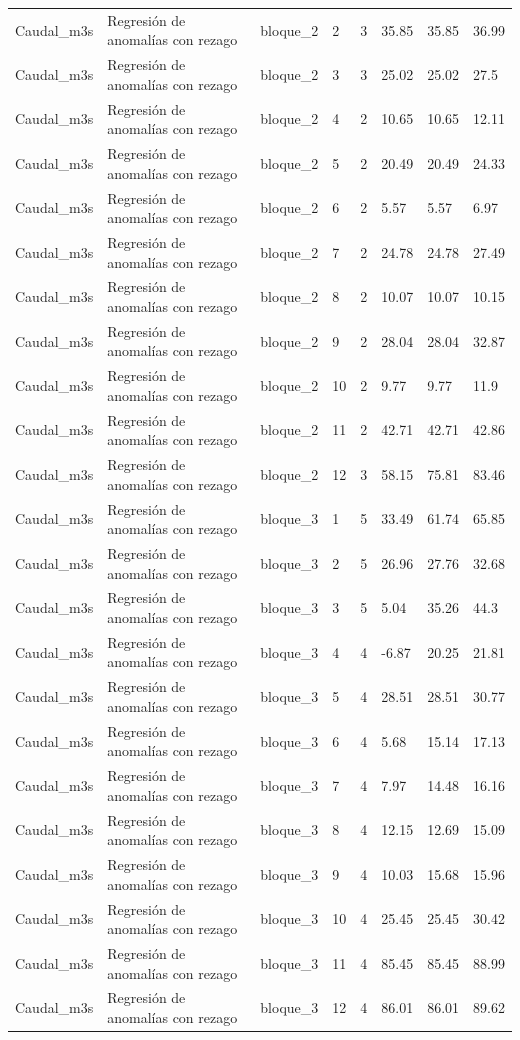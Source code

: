 \begin{longtable}{llllllll}
Caudal\_m3s & Regresión de anomalías con rezago & bloque\_2 & 2 & 3 & 35.85 & 35.85 & 36.99 \\
Caudal\_m3s & Regresión de anomalías con rezago & bloque\_2 & 3 & 3 & 25.02 & 25.02 & 27.5 \\
Caudal\_m3s & Regresión de anomalías con rezago & bloque\_2 & 4 & 2 & 10.65 & 10.65 & 12.11 \\
Caudal\_m3s & Regresión de anomalías con rezago & bloque\_2 & 5 & 2 & 20.49 & 20.49 & 24.33 \\
Caudal\_m3s & Regresión de anomalías con rezago & bloque\_2 & 6 & 2 & 5.57 & 5.57 & 6.97 \\
Caudal\_m3s & Regresión de anomalías con rezago & bloque\_2 & 7 & 2 & 24.78 & 24.78 & 27.49 \\
Caudal\_m3s & Regresión de anomalías con rezago & bloque\_2 & 8 & 2 & 10.07 & 10.07 & 10.15 \\
Caudal\_m3s & Regresión de anomalías con rezago & bloque\_2 & 9 & 2 & 28.04 & 28.04 & 32.87 \\
Caudal\_m3s & Regresión de anomalías con rezago & bloque\_2 & 10 & 2 & 9.77 & 9.77 & 11.9 \\
Caudal\_m3s & Regresión de anomalías con rezago & bloque\_2 & 11 & 2 & 42.71 & 42.71 & 42.86 \\
Caudal\_m3s & Regresión de anomalías con rezago & bloque\_2 & 12 & 3 & 58.15 & 75.81 & 83.46 \\
Caudal\_m3s & Regresión de anomalías con rezago & bloque\_3 & 1 & 5 & 33.49 & 61.74 & 65.85 \\
Caudal\_m3s & Regresión de anomalías con rezago & bloque\_3 & 2 & 5 & 26.96 & 27.76 & 32.68 \\
Caudal\_m3s & Regresión de anomalías con rezago & bloque\_3 & 3 & 5 & 5.04 & 35.26 & 44.3 \\
Caudal\_m3s & Regresión de anomalías con rezago & bloque\_3 & 4 & 4 & -6.87 & 20.25 & 21.81 \\
Caudal\_m3s & Regresión de anomalías con rezago & bloque\_3 & 5 & 4 & 28.51 & 28.51 & 30.77 \\
Caudal\_m3s & Regresión de anomalías con rezago & bloque\_3 & 6 & 4 & 5.68 & 15.14 & 17.13 \\
Caudal\_m3s & Regresión de anomalías con rezago & bloque\_3 & 7 & 4 & 7.97 & 14.48 & 16.16 \\
Caudal\_m3s & Regresión de anomalías con rezago & bloque\_3 & 8 & 4 & 12.15 & 12.69 & 15.09 \\
Caudal\_m3s & Regresión de anomalías con rezago & bloque\_3 & 9 & 4 & 10.03 & 15.68 & 15.96 \\
Caudal\_m3s & Regresión de anomalías con rezago & bloque\_3 & 10 & 4 & 25.45 & 25.45 & 30.42 \\
Caudal\_m3s & Regresión de anomalías con rezago & bloque\_3 & 11 & 4 & 85.45 & 85.45 & 88.99 \\
Caudal\_m3s & Regresión de anomalías con rezago & bloque\_3 & 12 & 4 & 86.01 & 86.01 & 89.62 \\
\end{longtable}

